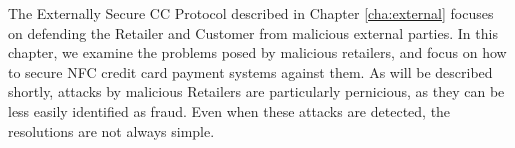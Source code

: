 The Externally Secure CC Protocol described in Chapter \ref{cha:external} focuses on defending the Retailer and Customer from malicious external parties.
In this chapter, we examine the problems posed by malicious retailers, and focus on how to secure NFC credit card payment systems against them.
As will be described shortly, attacks by malicious Retailers are particularly pernicious, as they can be less easily identified as fraud.
Even when these attacks are detected, the resolutions are not always simple.
